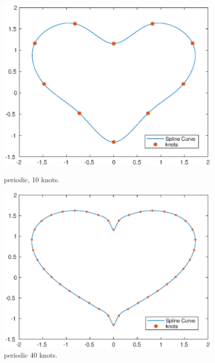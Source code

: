 \documentclass[11pt,en]{elegantpaper}
\begin{document}
\begin{figure}[htbp]
    \centering
    \begin{minipage}[t]{0.33\linewidth}
        \centering
        \includegraphics[width=0.95\linewidth]{figure/assE_10knots_periodic.eps}
        \caption{periodic, 10 knots.}
        \label{fig:side:a}
    \end{minipage}%
    \begin{minipage}[t]{0.33\linewidth}
        \centering
        \includegraphics[width=0.95\linewidth]{figure/assE_40knots_periodic.eps}
        \caption{periodic 40 knots.}
        \label{fig:side:b}
    \end{minipage}
    \begin{minipage}[t]{0.33\linewidth}
        \centering

\end{minipage}
\end{figure}
\end{document}
